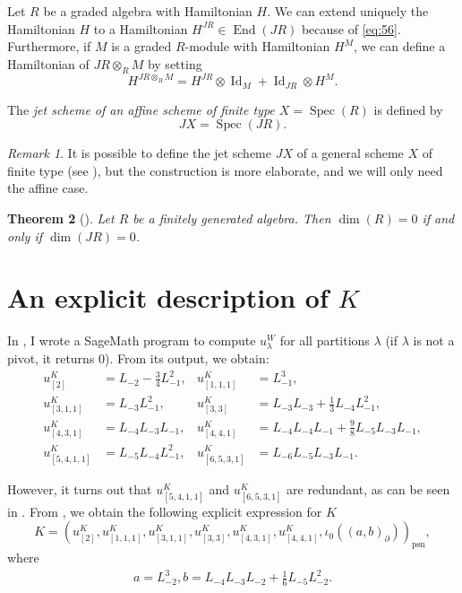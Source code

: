 \documentclass[a4paper, 12pt, reqno]{amsart}
\newtheorem{theorem}{Theorem}[section]
\theoremstyle{remark}
\newtheorem{remark}[theorem]{Remark}
\DeclareMathOperator{\Id}{Id}
\DeclareMathOperator{\End}{End}
\DeclareMathOperator{\psn}{psn}
\DeclareMathOperator{\Spec}{Spec}
\begin{document}
Let $R$ be a graded algebra with Hamiltonian $H$.
We can extend uniquely the Hamiltonian $H$ to a Hamiltonian $H^{JR} \in \End(JR)$ because of \eqref{eq:56}.
Furthermore, if $M$ is a graded $R$-module with Hamiltonian $H^M$, we can define a Hamiltonian of $JR \otimes_R M$ by setting
\begin{equation*}
  H^{JR \otimes_R M} = H^{JR}\otimes\Id_{M} + \Id_{JR}\otimes H^M.
\end{equation*}

The \emph{jet scheme of an affine scheme of finite type $X = \Spec(R)$} is defined by
\begin{equation*}
  JX = \Spec(JR).
\end{equation*}

\begin{remark}
  \label{rmk:56}
  It is possible to define the jet scheme $JX$ of a general scheme $X$ of finite type (see \cite{ein_jet_2008}), but the construction is more elaborate, and we will only need the affine case.
\end{remark}

\begin{theorem}[{\cite{ein_jet_2008}}]
  \label{thr:62}
  Let $R$ be a finitely generated algebra.
  Then $\dim(R) = 0$ if and only if $\dim(JR) = 0$.
\end{theorem}

\section{An explicit description of $K$}
\label{sec:an-expl-descr}

In \cite[ising-modules.ipynb]{sagemath2}, I wrote a SageMath program to compute $u^W_{\lambda}$ for all partitions $\lambda$ (if $\lambda$ is not a pivot, it returns $0$).
From its output, we obtain:
\begin{align*}
  u^K_{[2]} &= L_{-2} - \tfrac{3}{4}L_{-1}^2, &u^K_{[1, 1, 1]} &= L_{-1}^3, \\
  u^K_{[3, 1, 1]} &= L_{-3}L_{-1}^2, &u^K_{[3, 3]} &= L_{-3}L_{-3} + \tfrac{1}{3}L_{-4}L_{-1}^2, \\
  u^K_{[4, 3, 1]} &= L_{-4}L_{-3}L_{-1}, &u^K_{[4, 4, 1]} &= L_{-4}L_{-4}L_{-1} + \tfrac{9}{8}L_{-5}L_{-3}L_{-1}, \\
  u^K_{[5, 4, 1, 1]} &= L_{-5}L_{-4}L_{-1}^2, &u^K_{[6, 5, 3, 1]} &= L_{-6}L_{-5}L_{-3}L_{-1}.
\end{align*}

However, it turns out that $u^K_{[5, 4, 1, 1]}$ and $u^K_{[6, 5, 3, 1]}$ are redundant, as can be seen in \cite[m11-m15.ipynb]{sagemath2}.
From \cite[Theorem 2]{andrews_singular_2022}, we obtain the following explicit expression for $K$
\begin{equation*}
  K = (u^K_{[2]}, u^K_{[1, 1, 1]}, u^K_{[3, 1, 1]}, u^K_{[3, 3]}, u^K_{[4, 3, 1]}, u^K_{[4, 4, 1]}, \iota_0((a, b)_{\partial}))_{\psn},
\end{equation*}
where
\begin{align*}
  a = L_{-2}^3, b = L_{-4}L_{-3}L_{-2} + \tfrac{1}{6}L_{-5}L_{-2}^2.
\end{align*}
\end{document}
